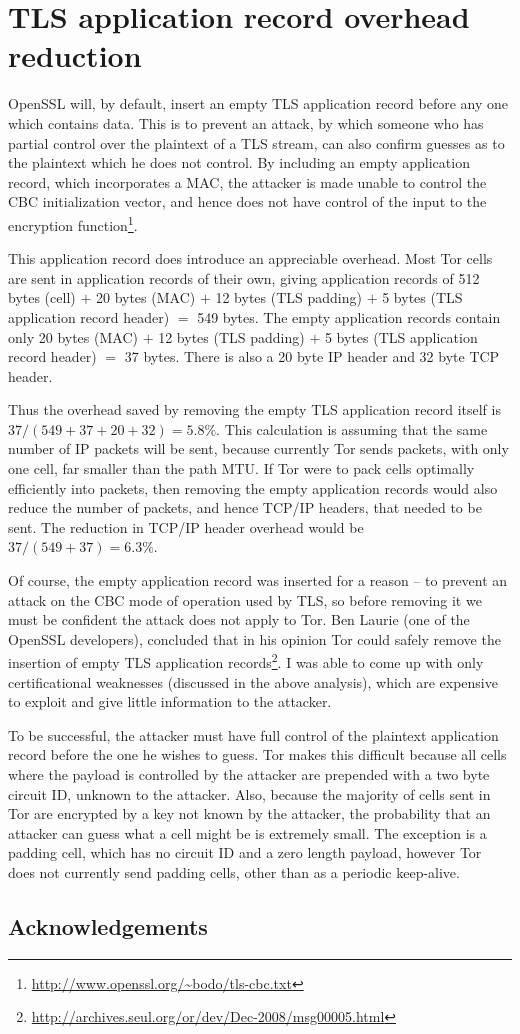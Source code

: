 \documentclass{article}
\begin{document}
\section{TLS application record overhead reduction}

OpenSSL will, by default, insert an empty TLS application record before any one which contains data.
This is to prevent an attack, by which someone who has partial control over the plaintext of a TLS stream, can also confirm guesses as to the plaintext which he does not control.
By including an empty application record, which incorporates a MAC, the attacker is made unable to control the CBC initialization vector, and hence does not have control of the input to the encryption function\footnote{\url{http://www.openssl.org/~bodo/tls-cbc.txt}}.

This application record does introduce an appreciable overhead.
Most Tor cells are sent in application records of their own, giving application records of 512 bytes (cell) $+$ 20 bytes (MAC) $+$ 12 bytes (TLS padding) $+$ 5 bytes (TLS application record header) $=$ 549 bytes.
The empty application records contain only 20 bytes (MAC) $+$ 12 bytes (TLS padding) $+$ 5 bytes (TLS application record header) $=$ 37 bytes.
There is also a 20 byte IP header and 32 byte TCP header.

Thus the overhead saved by removing the empty TLS application record itself is $37 / (549 + 37 + 20 + 32) = 5.8\%$.
This calculation is assuming that the same number of IP packets will be sent, because currently Tor sends packets, with only one cell, far smaller than the path MTU.
If Tor were to pack cells optimally efficiently into packets, then removing the empty application records would also reduce the number of packets, and hence TCP/IP headers, that needed to be sent.
The reduction in TCP/IP header overhead would be $37/(549 + 37) = 6.3\%$.

Of course, the empty application record was inserted for a reason -- to prevent an attack on the CBC mode of operation used by TLS, so before removing it we must be confident the attack does not apply to Tor.
Ben Laurie (one of the OpenSSL developers), concluded that in his opinion Tor could safely remove the insertion of empty TLS application records\footnote{\url{http://archives.seul.org/or/dev/Dec-2008/msg00005.html}}.
I was able to come up with only certificational weaknesses (discussed in the above analysis), which are expensive to exploit and give little information to the attacker.

To be successful, the attacker must have full control of the plaintext application record before the one he wishes to guess.
Tor makes this difficult because all cells where the payload is controlled by the attacker are prepended with a two byte circuit ID, unknown to the attacker.
Also, because the majority of cells sent in Tor are encrypted by a key not known by the attacker, the probability that an attacker can guess what a cell might be is extremely small.
The exception is a padding cell, which has no circuit ID and a zero length payload, however Tor does not currently send padding cells, other than as a periodic keep-alive.

\subsection*{Acknowledgements}

\end{document}
